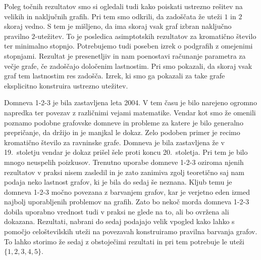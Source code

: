 \documentclass[12pt,a4paper,twoside]{article}
\newcommand{\literatura}{literatura}  %
\theoremstyle{definition} %
\theoremstyle{plain} %
\numberwithin{equation}{section}  %
\begin{document}
Poleg točnih rezultatov smo si ogledali tudi kako poiskati ustrezno rešitev na velikih in naključnih grafih. Pri tem smo odkrili, da zadoščata že uteži $1$ in $2$ skoraj vedno. S tem je mišljeno, da ima skoraj vsak graf izbran naključno pravilno $2$-utežitev. To je posledica asimptotskih rezultatov za kromatično število ter minimalno stopnjo. Potrebujemo tudi poseben izrek o podgrafih z omejenimi stopnjami. Rezultat je presenetljiv in nam poenostavi računanje parametra za večje grafe, če zadoščajo določenim lastnostim. Pri smo pokazali, da skoraj vsak graf tem lastnostim res zadošča. Izrek, ki smo ga pokazali za take grafe eksplicitno konstruira ustrezno utežitev.

Domneva 1-2-3 je bila zastavljena leta 2004. V tem času je bilo narejeno ogromno napredka ter povezav z različnimi vejami matematike. Vendar kot smo že omenili poznamo podobne grafovske domneve in probleme za katere je bilo generalno prepričanje, da držijo in je manjkal le dokaz. Zelo podoben primer je recimo kromatično število za ravninske grafe. Domneva je bila zastavljena že v 19.\ stoletju vendar je dokaz prišel šele proti koncu 20.\ stoletja. Pri tem je bilo mnogo neuspelih poizkusov. Trenutno uporabe domneve 1-2-3 oziroma njenih rezultatov v praksi nisem zasledil in je zato zanimiva zgolj teoretično saj nam podaja neko lastnost grafov, ki je bila do sedaj še neznana. Kljub temu je domneva 1-2-3 močno povezana z barvanjem grafov, kar je verjetno eden izmed najbolj uporabljenih problemov na grafih. Zato bo nekoč morda domneva 1-2-3 dobila uporabno vrednost tudi v praksi ne glede na to, ali bo ovržena ali dokazana. Rezultati, nabrani do sedaj podajajo velik vpogled kako lahko s pomočjo celoštevilskih uteži na povezavah konstruiramo pravilna barvanja grafov. To lahko storimo že sedaj z obstoječimi rezultati in pri tem potrebuje le uteži $\{1,2,3,4,5\}$.


 
\cleardoublepage                           %

\cleardoublepage                           %
\printindex
\end{document}
